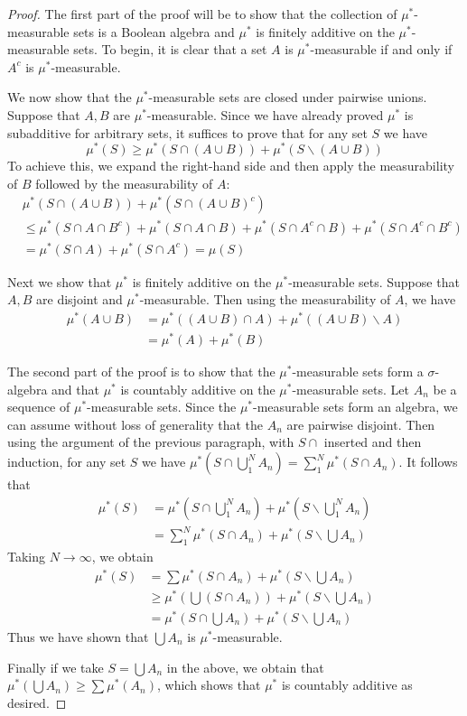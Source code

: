 \documentclass[10pt,oneside]{amsbook}
\renewcommand{\setminus}{\smallsetminus}
\theoremstyle{definition}
\theoremstyle{plain}
\theoremstyle{definition}
\theoremstyle{remark}
\numberwithin{equation}{section}
\numberwithin{figure}{section}
\begin{document}
\begin{proof}
  The first part of the proof will be to show that the collection of $\mu^*$-measurable sets is a Boolean algebra and $\mu^*$ is finitely additive on the $\mu^*$-measurable sets. To begin, it is clear that a set $A$ is $\mu^*$-measurable if and only if $A^c$ is $\mu^*$-measurable.

  We now show that the $\mu^*$-measurable sets are closed under pairwise unions. Suppose that $A,B$ are $\mu^*$-measurable. Since we have already proved $\mu^*$ is subadditive for arbitrary sets, it suffices to prove that for any set $S$ we have
  \[\mu^*(S)\geq\mu^*(S\cap(A\cup B))+\mu^*(S\setminus(A\cup B))
  \]
  To achieve this, we expand the right-hand side and then apply the measurability of $B$ followed by the measurability of $A$:
  \begin{align*}
    &\mu^*(S\cap(A\cup B))+\mu^*(S\cap(A\cup B)^c)\\
    &\leq \mu^*(S\cap A\cap B^c)+\mu^*(S\cap A\cap B)+\mu^*(S\cap A^c\cap B)+\mu^*(S\cap A^c\cap B^c)\\
    &=\mu^*(S\cap A)+\mu^*(S\cap A^c)=\mu(S)
  \end{align*}

  Next we show that $\mu^*$ is finitely additive on the $\mu^*$-measurable sets. Suppose that $A,B$ are disjoint and $\mu^*$-measurable. Then using the measurability of $A$, we have
  \begin{align*}
    \mu^*(A\cup B)&=\mu^*((A\cup B)\cap A)+\mu^*((A\cup B)\setminus A)\\
                  &=\mu^*(A)+\mu^*(B)
  \end{align*}

  The second part of the proof is to show that the $\mu^*$-measurable sets form a $\sigma$-algebra and that $\mu^*$ is countably additive on the $\mu^*$-measurable sets. Let $A_n$ be a sequence of $\mu^*$-measurable sets. Since the $\mu^*$-measurable sets form an algebra, we can assume without loss of generality that the $A_n$ are pairwise disjoint. Then using the argument of the previous paragraph, with $S\cap$ inserted and then induction, for any set $S$ we have $\mu^*(S\cap\bigcup_1^N A_n)=\sum_1^N\mu^*(S\cap A_n)$. It follows that
  \begin{align*}
    \mu^*(S)&=\mu^*(S\cap\bigcup_1^N A_n)+\mu^*(S\setminus\bigcup_1^N A_n)\\
            &=\sum_1^N\mu^*(S\cap A_n)+\mu^*(S\setminus\bigcup A_n)
  \end{align*}
  Taking $N\to\infty$, we obtain
  \begin{align*}
    \mu^*(S)&=\sum\mu^*(S\cap A_n)+\mu^*(S\setminus\bigcup A_n)\\
            &\geq\mu^*(\bigcup (S\cap A_n))+\mu^*(S\setminus\bigcup A_n)\\
            &=\mu^*(S\cap\bigcup A_n)+\mu^*(S\setminus\bigcup A_n)
  \end{align*}
  Thus we have shown that $\bigcup A_n$ is $\mu^*$-measurable.

  Finally if we take $S=\bigcup A_n$ in the above, we obtain that $\mu^*(\bigcup A_n)\geq\sum\mu^*(A_n)$, which shows that $\mu^*$ is countably additive as desired.
\end{proof}
\end{document}
